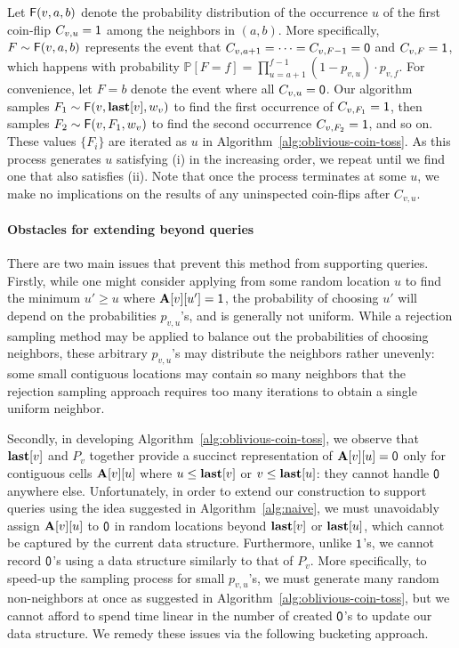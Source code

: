 Let $\mathsf{F}(v,a,b)$ denote the probability distribution of the occurrence $u$ of the first coin-flip $C_{v,u} = \mathsf{1}$ among the neighbors in $(a, b)$.
More specifically, $F\sim\mathsf{F}(v,a,b)$ represents the event that $C_{v,a+1}=\cdots=C_{v,F-1}=\mathsf{0}$ and $C_{v,F}=\mathsf{1}$,
which happens with probability $\mathbb P[F=f]=\prod_{u=a+1}^{f-1} (1-p_{v,u}) \cdot p_{v,f}$.
For convenience, let $F = b$ denote the event where all $C_{v,u}=\mathsf{0}$. Our algorithm samples $F_1\sim\mathsf{F}(v,\mathbf{last}[v],w_v)$ to find the first occurrence of $C_{v,F_1} = \mathsf{1}$, then samples $F_2\sim\mathsf{F}(v,F_1,w_v)$ to find the second occurrence $C_{v,F_2} = \mathsf{1}$, and so on.
These values $\{F_i\}$ are iterated as $u$ in Algorithm~\ref{alg:oblivious-coin-toss}.
As this process generates $u$ satisfying (i) in the increasing order, we repeat until we find one that also satisfies (ii).
Note that once the process terminates at some $u$, we make no implications on the results of any uninspected coin-flips after $C_{v,u}$.

\paragraph*{Obstacles for extending beyond  queries}
There are two main issues that prevent this method from supporting  queries. Firstly, while one might consider applying  from some random location $u$ to find the minimum $u' \geq u$ where $\mathbf{A}[v][u']=\mathsf{1}$, the probability of choosing $u'$ will depend on the probabilities $p_{v,u}$'s, and is generally not uniform. While a rejection sampling method may be applied to balance out the probabilities of choosing neighbors, these arbitrary $p_{v,u}$'s may distribute the neighbors rather unevenly: some small contiguous locations may contain so many neighbors that the rejection sampling approach requires too many iterations to obtain a single uniform neighbor.

 Secondly, in developing Algorithm~\ref{alg:oblivious-coin-toss}, we observe that $\mathbf{last}[v]$ and $P_v$ together provide a succinct representation of $\mathbf{A}[v][u] = \mathsf{0}$ only for contiguous cells $\mathbf{A}[v][u]$ where $u \leq \mathbf{last}[v]$ or $v \leq \mathbf{last}[u]$: they cannot handle $\mathsf{0}$ anywhere else. Unfortunately, in order to extend our construction to support  queries using the idea suggested in Algorithm~\ref{alg:naive}, we must unavoidably assign $\mathbf{A}[v][u]$ to $\mathsf{0}$ in random locations beyond $\mathbf{last}[v]$ or $\mathbf{last}[u]$, which cannot be captured by the current data structure. Furthermore, unlike $\mathsf{1}$'s, we cannot record $\mathsf{0}$'s using a data structure similarly to that of $P_v$. More specifically, to speed-up the sampling process for small $p_{v,u}$'s, we must generate many random non-neighbors at once as suggested in Algorithm~\ref{alg:oblivious-coin-toss}, but we cannot afford to spend time linear in the number of created $\mathsf{0}$'s to update our data structure. We remedy these issues via the following bucketing approach.

